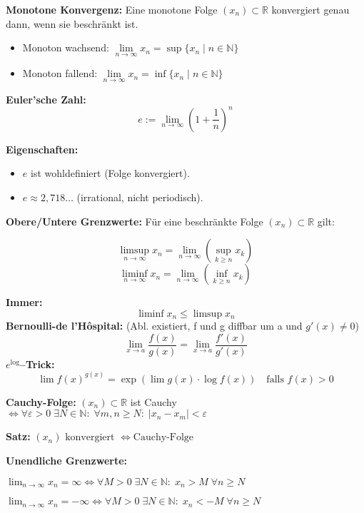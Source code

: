 \textbf{Monotone Konvergenz:}  
Eine monotone Folge \( (x_n) \subset \mathbb{R} \) konvergiert genau dann, wenn sie beschränkt ist.

\begin{itemize}
  \item Monoton wachsend:  
  \( \lim\limits_{n \to \infty} x_n = \sup \{ x_n \mid n \in \mathbb{N} \} \)

  \item Monoton fallend:  
  \( \lim\limits_{n \to \infty} x_n = \inf \{ x_n \mid n \in \mathbb{N} \} \)
\end{itemize}

\textbf{Euler'sche Zahl:}  
\[
e := \lim\limits_{n \to \infty} \left( 1 + \frac{1}{n} \right)^n
\]

\textbf{Eigenschaften:}
\begin{itemize}
  \item \( e \) ist wohldefiniert (Folge konvergiert).
  \item \( e \approx 2{,}718\ldots \) (irrational, nicht periodisch).
\end{itemize}

\textbf{Obere/Untere Grenzwerte:}  
Für eine beschränkte Folge \( (x_n) \subset \mathbb{R} \) gilt:

\[
\limsup\limits_{n \to \infty} x_n = \lim\limits_{n \to \infty} \left( \sup_{k \geq n} x_k \right)
\]
\[
\liminf\limits_{n \to \infty} x_n = \lim\limits_{n \to \infty} \left( \inf_{k \geq n} x_k \right)
\]

\textbf{Immer:}  
\[
\liminf x_n \leq \limsup x_n
\]
\textbf{Bernoulli-de l'Hôspital:} (Abl. existiert, f und g diffbar um a und $g'(x) \not = 0$)
\[
\lim\limits_{x \to a} \frac{f(x)}{g(x)} = \lim\limits_{x \to a} \frac{f'(x)}{g'(x)}
\]
\textbf{\( e^{\log} \)–Trick:}  
\[
\lim f(x)^{g(x)} = \exp\left( \lim g(x) \cdot \log f(x) \right)
\quad \text{falls } f(x) > 0
\]

\textbf{Cauchy-Folge:}  
$(x_n) \subset \mathbb{R}$ ist Cauchy  
$\Leftrightarrow \forall \varepsilon > 0\; \exists N \in \mathbb{N}:\; \forall m,n \geq N:\; |x_n - x_m| < \varepsilon$

\textbf{Satz:}  
$
(x_n) \text{ konvergiert } \Leftrightarrow \text{Cauchy-Folge}
$

\textbf{Unendliche Grenzwerte:}  

$
\lim_{n \to \infty} x_n = \infty \Leftrightarrow  
\forall M > 0\; \exists N \in \mathbb{N}:\; x_n > M\; \forall n \geq N
$

$
\lim_{n \to \infty} x_n = -\infty \Leftrightarrow  
\forall M > 0\; \exists N \in \mathbb{N}:\; x_n < -M\; \forall n \geq N
$

